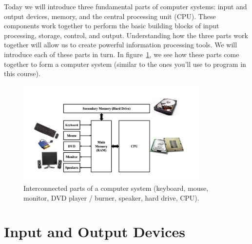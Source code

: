 Today we will introduce three fundamental parts of computer systems:
input and output devices, memory, and the central processing unit (CPU).
These components work together to perform the basic building blocks of
input processing, storage, control, and output. Understanding how the
three parts work together will allow us to create powerful information
processing tools. We will introduce each of these parts in turn.
In figure~\ref{fig:hardware:overview}, we see how these parts come
together to form a computer system (similar to the ones you'll use
to program in this course).

\begin{figure}
	\centering
	\includegraphics[width=0.85\textwidth]{images/cs_intro_hardware_overview.png}
	\caption{Interconnected parts of a computer system (keyboard, mouse,
                 monitor, DVD player / burner, speaker, hard drive, CPU).}
	\label{fig:hardware:overview}
\end{figure}

\section{Input and Output Devices}

